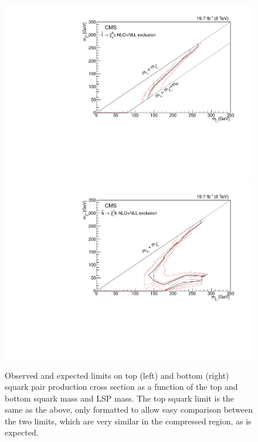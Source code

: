 \begin{figure}[!Hhtb]
  \begin{center}
  \includegraphics[scale=0.39]{Figures/sus13009/limits/mstop_lsp.pdf}
  \includegraphics[scale=0.39]{Figures/sus13009/sbottomlimits/msbottom_lsp.pdf}
  \caption{ Observed and expected limits on top (left) and bottom (right) squark pair production cross section as a function of the top and bottom squark mass and LSP mass. The top squark limit is the same as the above, only formatted to allow easy comparison between the two limits, which are very similar in the compressed region, as is expected. }
  \label{fig:sbottom_limits_2D}
  \end{center}
\end{figure}




